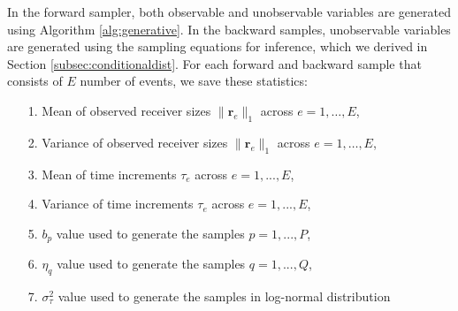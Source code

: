 \documentclass[ba]{imsart}
\numberwithin{equation}{section}
\theoremstyle{plain}
\begin{document}
	In the forward sampler, both observable and unobservable variables are generated using Algorithm \ref{alg:generative}. In the backward samples, unobservable variables are generated using the sampling equations for inference, which we derived in Section \ref{subsec:conditionaldist}. For each forward and backward sample that consists of $E$ number of events, we save these statistics:\\
	\begin{itemize}
		\item[1.] Mean of observed receiver sizes $ \lVert \boldsymbol{r}_{e} \rVert_1 $ across $e=1,\ldots,E$,
		\item[2.] Variance of observed receiver sizes $ \lVert \boldsymbol{r}_{e} \rVert_1 $ across $e=1,\ldots,E$,
		\item[3.] Mean of time increments $\tau_e$ across $e=1,...,E$,
		\item[4.] Variance of time increments $\tau_e$ across $e=1,...,E$,
		\item[5.] $b_p$ value used to generate the samples $p = 1,...,P$,
		\item[6.] $\eta_q$ value used to generate the samples $q = 1,...,Q$,
		\item[7.] $\sigma^2_\tau$ value used to generate the samples in log-normal distribution
	\end{itemize}
	
\end{document}
